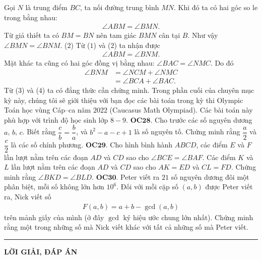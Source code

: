 \begin{multicols}{2}
	Gọi $N$ là trung điểm $BC$, ta nối đường trung bình $MN$. Khi đó ta có hai góc so le trong bằng nhau:
	\begin{align*}
		\angle ABM = \angle BMN. \tag{$1$}
	\end{align*}	
	Từ giả thiết ta có $BM= BN$ nên tam giác $BMN$ cân tại $B$.
	\vskip 0.1cm
	Như vậy $\angle BMN =\angle BNM$. \hfill ($2$)
	\vskip 0.1cm
	Từ ($1$) và ($2$) ta nhận được
	\begin{align*}
		\angle ABM= \angle BNM. \tag{$3$}
	\end{align*}
	Mặt khác ta cũng có hai góc đồng vị bằng nhau: $\angle BAC=\angle NMC$. Do đó 
	\begin{align*}
		\angle BNM&= \angle NCM + \angle NMC\\
		&= \angle BCA + \angle BAC. \tag{$4$}
	\end{align*}
	Từ ($3$) và ($4$) ta có đẳng thức cần chứng minh.
	\vskip 0.1cm
	Trong phần cuối của chuyên mục kỳ này, chúng tôi sẽ giới thiệu với bạn đọc các bài toán trong kỳ thi Olympic Toán học vùng Cáp--ca năm $2022$ (Caucasus Math Olympiad). Các bài toán này phù hợp với trình độ học sinh lớp $8-9$.
	\vskip 0.1cm
	{\bf\color{cackithi} OC$\pmb{28.}$} Cho trước các số nguyên dương $a$, $b$, $c$. Biết rằng $\dfrac{c}{b} = \dfrac{b}{a}$, và $b^2 - a - c + 1$ là số nguyên tố. Chứng minh rằng $\dfrac{a}{2}$ và $\dfrac{c}{2}$ là các số chính phương.
	\vskip 0.1cm
	{\bf\color{cackithi} OC$\pmb{29.}$} Cho hình bình hành $ABCD$, các điểm $E$ và $F$ lần lượt nằm trên các đoạn $AD$ và $CD$ sao cho $\angle BCE = \angle BAF.$ Các điểm $K$ và $L$ lần lượt nằm trên các đoạn $AD$ và $CD$ sao cho $AK = ED$ và $CL = FD$. Chứng minh rằng $\angle BKD = \angle BLD$.
	\vskip 0.1cm
	{\bf\color{cackithi} OC$\pmb{30.}$} Peter viết ra $21$ số nguyên dương đôi một phân biệt, mỗi số không lớn hơn $10^6$. Đối với mỗi cặp số $(a, b)$ được Peter viết ra, Nick  viết  số
	\begin{align*}
		F(a, b) = a + b - \gcd (a, b)
	\end{align*}
	trên mảnh giấy của mình (ở đây $\gcd$ ký hiệu ước chung lớn nhất). 
	\vskip 0.1cm
	Chứng minh rằng một trong những số mà Nick viết khác với tất cả những số mà Peter viết. 
\end{multicols}
\vspace*{-10pt}
{\color{cackithi}\rule{1\linewidth}{0.1pt}}
\vskip 0.3cm
\centerline{\LARGE{\textbf{\color{cackithi}LỜI GIẢI, ĐÁP ÁN}}}
